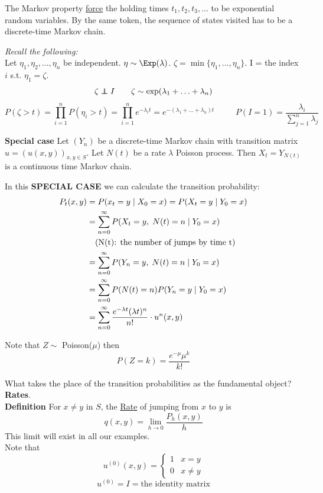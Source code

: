 \documentclass[12pt]{article}
\begin{document}
The Markov property \underline{force} the holding times $t_1,t_2,t_3,...$ to be exponential random variables. By the same token, the sequence of states visited has to be a discrete-time Markov chain.

\vspace{1\baselineskip}
{\sl Recall the following:}\\
Let $\eta_1,\eta_2,...,\eta_n$ be independent. $\eta\sim\Exp(\lambda)$. $\zeta = \min\{\eta_1,...,\eta_n\}$. I = the index $i$ s.t. $\eta_1 = \zeta$.
$$\zeta \independent I \qquad \zeta\sim\exp(\lambda_1+\ldots+\lambda_n)$$
$$P(\zeta>t)=\prod\limits_{i=1}^n P(\eta_i > t) = \prod\limits_{i=1}^n e^{-\lambda_i t} = e^{-(\lambda_1+\ldots+\lambda_n)t}\qquad\;\;
P(I=1) = \frac{\lambda_i}{\sum\limits_{j=1}^n \lambda_j}$$

\newpage
{\bf Special case} Let $(Y_n)$ be a discrete-time Markov chain with transition matrix $u=(u(x,y))_{x,y\in S}$. Let $N(t)$ be a rate $\lambda$ Poisson process. Then $X_t = Y_{N(t)}$ is a continuous time Markov chain.

In this {\bf SPECIAL CASE} we can calculate the transition probability:
\begin{align}
    P_t(x,y) &= P(x_t=y\;|\;X_0=x) = P(X_t=y\;|\;Y_0=x) \nonumber \\
    &=\sum\limits_{n=0}^\infty P(X_t=y,\;N(t)=n\;|\;Y_0=x) \nonumber \\
    &\text{\quad (N(t): the number of jumps by time t)} \nonumber \\
    &=\sum\limits_{n=0}^\infty P(Y_n=y,\;N(t)=n\;|\;Y_0=x) \nonumber \\ 
    &=\sum\limits_{n=0}^\infty P(N(t)=n)P(Y_n=y\;|\;Y_0=x) \nonumber \\
    &= \sum\limits_{n=0}^\infty \frac{e^{-\lambda t} (\lambda t)^n}{n!} \cdot u^n(x,y) \nonumber
\end{align}

Note that $Z\sim$ Poisson($\mu$) then
$$P(Z=k) = \frac{e^{-\mu}\mu^k}{k!}$$

\vspace{1\baselineskip}
What takes the place of the transition probabilities as the fundamental object? {\bf Rates}.\\

{\bf Definition} For $x\neq y$ in $S$, the \underline{Rate} of jumping from $x$ to $y$ is 
$$q(x,y)=\lim\limits_{h\to 0} \frac{P_h(x,y)}{h}$$
This limit will exist in all our examples. \\

\vspace{1\baselineskip}
Note that 
$$u^{(0)}(x,y) = \begin{cases} 1&x=y\\0&x\neq y\end{cases}$$
$$u^{(0)} = I = \text{the identity matrix}$$
\end{document}
